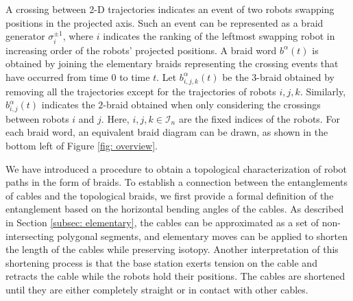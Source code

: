 \documentclass[conference]{IEEEtran}
\newcommand*{\myset}[1]{\mathcal{#1}} %
\newcommand*{\projang}{\alpha} %
\newcommand*{\projplane}{\myset{P}} %
\newcommand*{\btau}{\tau} %
\newcommand*{\bgen}{\sigma} %
\newcommand*{\word}{b} %
\newcommand*{\totalnum}{K} %
\begin{document}
A crossing between 2-D trajectories indicates an event of two robots swapping positions in the projected axis.
Such an event can be represented as a braid generator $\bgen_i^{\pm1}$, where $i$ indicates the ranking of the leftmost swapping robot in increasing order of the robots' projected positions. 
A braid word $\word^{\projang}(t)$ is obtained by joining the elementary braids representing the crossing events that have occurred from time $0$ to time $t$.
Let $\word^\projang_{i,j,k}(t)$ be the $3$-braid obtained by removing all the trajectories except for the trajectories of robots $i,j,k$.
Similarly, $\word^\projang_{i,j}(t)$ indicates the $2$-braid obtained when only considering the crossings between robots $i$ and $j$.
Here, $i,j,k\in\myset{I}_n$ are the fixed indices of the robots.
For each braid word, an equivalent braid diagram can be drawn, as shown in the bottom left of Figure \ref{fig: overview}. 

We have introduced a procedure to obtain a topological characterization of robot paths in the form of braids. To establish a connection between the entanglements of cables and the topological braids,
we first provide a formal definition of the entanglement based on the horizontal bending angles of the cables.
As described in Section \ref{subsec: elementary}, the cables can be approximated as a set of non-intersecting polygonal segments, 
and elementary moves can be applied to shorten the length of the cables while preserving isotopy.
Another interpretation of this shortening process is that the base station exerts tension on the cable and retracts the cable while the robots hold their positions.
The cables are shortened until they are either completely straight or in contact with other cables.
\end{document}
